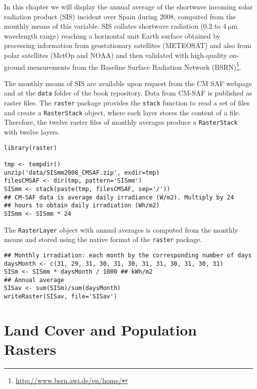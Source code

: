 In this chapter we will display the annual average of the shortwave
incoming solar radiation product (SIS) incident over Spain during
2008, computed from the monthly means of this variable. SIS collates
shortwave radiation ($0.2$ to $\SI{4}{\micro\meter}$ wavelength range)
reaching a horizontal unit Earth surface obtained by processing
information from geostationary satellites (METEOSAT) and also from
polar satellites (MetOp and NOAA) \cite{Schulz.Albert.ea2009} and then
validated with high-quality on-ground measurements from the Baseline
Surface Radiation Network (BSRN)\footnote{\url{http://www.bsrn.awi.de/en/home/}}.

The monthly means of SIS are available upon request from the CM SAF
webpage \cite{Posselt.Muller.ea2011} and at the \texttt{data} folder of the
book repository. Data from CM-SAF is published as raster files. The
\texttt{raster} package provides the \texttt{stack} function to read a set of files
and create a \texttt{RasterStack} object, where each layer stores the content
of a file. Therefore, the twelve raster files of monthly averages
produce a \texttt{RasterStack} with twelve layers.


\lstset{language=R,numbers=none}
\begin{lstlisting}
library(raster)

tmp <- tempdir()
unzip('data/SISmm2008_CMSAF.zip', exdir=tmp)
filesCMSAF <- dir(tmp, pattern='SISmm')
SISmm <- stack(paste(tmp, filesCMSAF, sep='/'))
## CM-SAF data is average daily irradiance (W/m2). Multiply by 24
## hours to obtain daily irradiation (Wh/m2)
SISmm <- SISmm * 24
\end{lstlisting}

The \texttt{RasterLayer} object with annual averages is computed from the
monthly means and stored using the native format of the \texttt{raster}
package.
\lstset{language=R,numbers=none}
\begin{lstlisting}
## Monthly irradiation: each month by the corresponding number of days
daysMonth <- c(31, 29, 31, 30, 31, 30, 31, 31, 30, 31, 30, 31)
SISm <- SISmm * daysMonth / 1000 ## kWh/m2
## Annual average
SISav <- sum(SISm)/sum(daysMonth)
writeRaster(SISav, file='SISav')
\end{lstlisting}

\section{Land Cover and Population Rasters}
\label{sec-4}

